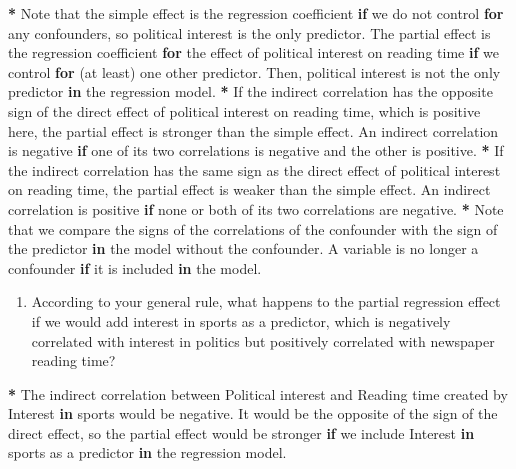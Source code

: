 \documentclass[a4paper]{book}
\newenvironment{Shaded}{\begin{snugshade}}{\end{snugshade}}
\newcommand{\StringTok}[1]{\textcolor[rgb]{0.00,0.00,0.00}{#1}}
\newcommand{\ControlFlowTok}[1]{\textcolor[rgb]{0.00,0.00,0.00}{\textbf{#1}}}
\newcommand{\OperatorTok}[1]{\textcolor[rgb]{0.00,0.00,0.00}{\textbf{#1}}}
\newcommand{\NormalTok}[1]{#1}
\providecommand{\tightlist}{%
  \setlength{\itemsep}{0pt}\setlength{\parskip}{0pt}}
\theoremstyle{definition}
\theoremstyle{definition}
\theoremstyle{definition}
\theoremstyle{remark}
\begin{document}
\begin{Shaded}
\begin{Highlighting}[]
\OperatorTok{*}\StringTok{ }\NormalTok{Note that the simple effect is the regression coefficient }\ControlFlowTok{if}\NormalTok{ we do not}
\NormalTok{control }\ControlFlowTok{for}\NormalTok{ any confounders, so political interest is the only predictor. The}
\NormalTok{partial effect is the regression coefficient }\ControlFlowTok{for}\NormalTok{ the effect of political}
\NormalTok{interest on reading time }\ControlFlowTok{if}\NormalTok{ we control }\ControlFlowTok{for}\NormalTok{ (at least) one other predictor.}
\NormalTok{Then, political interest is not the only predictor }\ControlFlowTok{in}\NormalTok{ the regression model.}
\OperatorTok{*}\StringTok{ }\NormalTok{If the indirect correlation has the opposite sign of the direct effect of}
\NormalTok{political interest on reading time, which is positive here, the partial effect}
\NormalTok{is stronger than the simple effect. An indirect correlation is negative }\ControlFlowTok{if}\NormalTok{ one}
\NormalTok{of its two correlations is negative and the other is positive.}
\OperatorTok{*}\StringTok{ }\NormalTok{If the indirect correlation has the same sign as the direct effect of}
\NormalTok{political interest on reading time, the partial effect is weaker than the}
\NormalTok{simple effect. An indirect correlation is positive }\ControlFlowTok{if}\NormalTok{ none or both of its two}
\NormalTok{correlations are negative.}
\OperatorTok{*}\StringTok{ }\NormalTok{Note that we compare the signs of the correlations of the confounder with}
\NormalTok{the sign of the predictor }\ControlFlowTok{in}\NormalTok{ the model without the confounder. A variable is}
\NormalTok{no longer a confounder }\ControlFlowTok{if}\NormalTok{ it is included }\ControlFlowTok{in}\NormalTok{ the model.}
\end{Highlighting}
\end{Shaded}

\begin{enumerate}
\def\labelenumi{\arabic{enumi}.}
\setcounter{enumi}{1}
\tightlist
\item
  According to your general rule, what happens to the partial regression
  effect if we would add interest in sports as a predictor, which is
  negatively correlated with interest in politics but positively
  correlated with newspaper reading time?
\end{enumerate}

\begin{Shaded}
\begin{Highlighting}[]
\OperatorTok{*}\StringTok{ }\NormalTok{The indirect correlation between Political interest and Reading time created}
\NormalTok{by Interest }\ControlFlowTok{in}\NormalTok{ sports would be negative. It would be the opposite of the sign}
\NormalTok{of the direct effect, so the partial effect would be stronger }\ControlFlowTok{if}\NormalTok{ we include}
\NormalTok{Interest }\ControlFlowTok{in}\NormalTok{ sports as a predictor }\ControlFlowTok{in}\NormalTok{ the regression model.}
\end{Highlighting}
\end{Shaded}
\end{document}
